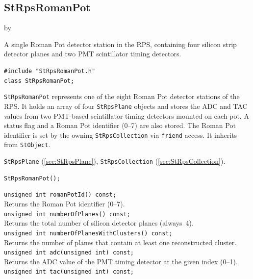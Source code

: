 \documentclass[twoside]{article}
\newcommand{\entrylabel}[1]{\mbox{\textbf{{#1}}}\hfil}%
\newenvironment{entry}
{\begin{list}{}%
    {\renewcommand{\makelabel}{\entrylabel}%
     \setlength{\labelwidth}{90pt}%
     \setlength{\leftmargin}{\labelwidth}
     \advance\leftmargin by \labelsep%
      }%
    }%
  {\end{list}}
\newcommand{\Entrylabel}[1]%
{\raisebox{0pt}[1ex][0pt]{\makebox[\labelwidth][l]%
    {\parbox[t]{\labelwidth}{\hspace{0pt}\textbf{{#1}}}}}}
\newenvironment{Entry}%
{\renewcommand{\entrylabel}{\Entrylabel}\begin{entry}}%
  {\end{entry}}
\begin{document}
\subsection{StRpsRomanPot}
\label{sec:StRpsRomanPot}
\begin{Entry}
\item[Summary] A single Roman Pot detector station in the RPS, containing four
    silicon strip detector planes and two PMT scintillator timing detectors.
\item[Synopsis]
    \verb+#include "StRpsRomanPot.h"+\\
    \verb+class StRpsRomanPot;+\\
\item[Description]
    \texttt{StRpsRomanPot} represents one of the eight Roman Pot detector
    stations of the RPS.  It holds an array of four \texttt{StRpsPlane} objects
    and stores the ADC and TAC values from two PMT-based scintillator timing
    detectors mounted on each pot.  A status flag and a Roman Pot identifier
    (0--7) are also stored.  The Roman Pot identifier is set by the owning
    \texttt{StRpsCollection} via \texttt{friend} access.
    It inherits from \texttt{StObject}.
\item[Related Classes]
    \texttt{StRpsPlane} (\ref{sec:StRpsPlane}),
    \texttt{StRpsCollection} (\ref{sec:StRpsCollection}).
\item[Public\\ Constructors]
    \verb+StRpsRomanPot();+\\
\item[Public Member\\ Functions]
    \verb+unsigned int romanPotId() const;+\\
    Returns the Roman Pot identifier (0--7).\\
    \verb+unsigned int numberOfPlanes() const;+\\
    Returns the total number of silicon detector planes (always~4).\\
    \verb+unsigned int numberOfPlanesWithClusters() const;+\\
    Returns the number of planes that contain at least one reconstructed cluster.\\
    \verb+unsigned int adc(unsigned int) const;+\\
    Returns the ADC value of the PMT timing detector at the given index (0--1).\\
    \verb+unsigned int tac(unsigned int) const;+\\

\end{Entry}
\end{document}

